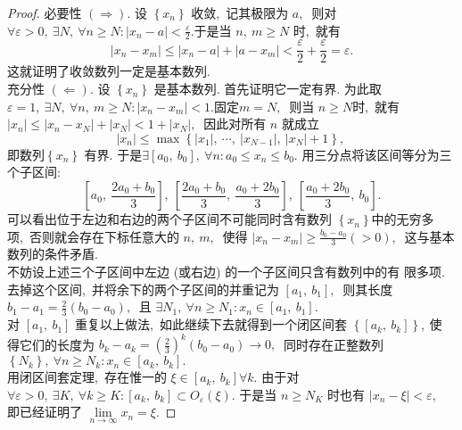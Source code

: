 \begin{proof}
	必要性 $ (\Longrightarrow) .$ 设  $\left\{x_{n}\right\} $ 收敛,\  记其极限为 $ a ,\ $ 则对  $\forall \varepsilon>0,\  \exists N,\  \forall n \geqslant N  :  \left|x_{n}-a\right|<\frac{\varepsilon}{2} . $于是当 $ n,\  m \geqslant N $ 时,\  就有
	$$\left|x_{n}-x_{m}\right| \leqslant\left|x_{n}-a\right|+\left|a-x_{m}\right|<\frac{\varepsilon}{2}+\frac{\varepsilon}{2}=\varepsilon.$$
	这就证明了收敛数列一定是基本数列.\\
	充分性  $(\Longleftarrow) .$ 设 $ \left\{x_{n}\right\} $ 是基本数列. 首先证明它一定有界. 为此取 $ \varepsilon=1 ,\   \exists N,\  \forall n,\  m \geqslant N:\left|x_{n}-x_{m}\right|<1 . $固定$  m=N ,\ $ 则当 $ n \geqslant N  $时,\  就有 $ \left|x_{n}\right| \leqslant   \left|x_{n}-x_{N}\right|+\left|x_{N}\right|<1+\left|x_{N}\right| ,\ $ 因此对所有 $ n $ 就成立
	$$\left|x_{n}\right| \leqslant \max \left\{\left|x_{1}\right|,\  \cdots,\ \left|x_{N-1}\right|,\ \left|x_{N}\right|+1\right\} \text {,\  }$$
	即数列$  \left\{x_{n}\right\} $ 有界.
	于是$  \exists\left[a_{0},\  b_{0}\right],\  \forall n: a_{0} \leqslant x_{n} \leqslant b_{0} .$ 用三分点将该区间等分为三个子区间:
	$$\left[a_{0},\  \frac{2 a_{0}+b_{0}}{3}\right],\ \left[\frac{2 a_{0}+b_{0}}{3},\  \frac{a_{0}+2 b_{0}}{3}\right],\ \left[\frac{a_{0}+2 b_{0}}{3},\  b_{0}\right].$$
	可以看出位于左边和右边的两个子区间不可能同时含有数列 $ \left\{x_{n}\right\}  $中的无穷多项,\  否则就会存在下标任意大的 $ n,\  m ,\ $ 使得 $ \left|x_{n}-x_{m}\right| \geqslant \frac{b_{0}-a_{0}}{3}(>0) ,\ $ 这与基本数列的条件矛盾.\\
	不妨设上述三个子区间中左边 (或右边) 的一个子区间只含有数列中的有 限多项. 去掉这个区间,\  并将余下的两个子区间的并重记为  $\left[a_{1},\  b_{1}\right] ,\ $ 则其长度  $b_{1}-a_{1}=\frac{2}{3}\left(b_{0}-a_{0}\right) ,\ $ 且  $\exists N_{1},\  \forall n \geqslant N_{1}: x_{n} \in\left[a_{1},\  b_{1}\right] .$\\
	对  $\left[a_{1},\  b_{1}\right]$  重复以上做法,\  如此继续下去就得到一个闭区间套  $\left\{\left[a_{k},\  b_{k}\right]\right\} ,\  $使 得它们的长度为  $b_{k}-a_{k}=\left(\frac{2}{3}\right)^{k}\left(b_{0}-a_{0}\right) \rightarrow 0 ,\ $ 同时存在正整数列  $\left\{N_{k}\right\} ,\   \forall n \geqslant N_{k}: x_{n} \in\left[a_{k},\  b_{k}\right] .$\\
	用闭区间套定理,\  存在惟一的  $\xi \in\left[a_{k},\  b_{k}\right] \forall k .$ 由于对  $\forall \varepsilon>0,\  \exists K,\  \forall k \geqslant   K:\left[a_{k},\  b_{k}\right] \subset O_{\varepsilon}(\xi) .$ 于是当 $ n \geqslant N_{K} $ 时也有 $ \left|x_{n}-\xi\right|<\varepsilon ,\ $ 即已经证明了 $ \lim\limits_{n \rightarrow \infty} x_{n}=\xi .$
\end{proof}

